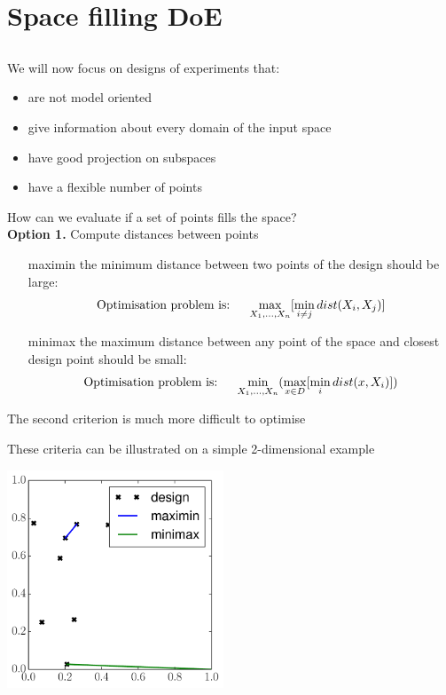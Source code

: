 \documentclass{beamer}
\begin{document}
\section{Space filling DoE}
\subsection{}


\begin{frame}{}
We will now focus on designs of experiments that:
\begin{itemize}
	\item are not model oriented
	\item give information about every domain of the input space
	\item have good projection on subspaces
	\item have a flexible number of points
\end{itemize}
\end{frame}

\begin{frame}{}
How can we evaluate if a set of points fills the space?\\ \vspace{5mm}
\textbf{Option 1.} Compute distances between points\\
\begin{itemize}
	\item[maximin] the minimum distance between two points of the design should be large:
	$$\text{Optimisation problem is: \quad} \max_{X_1,\dots,X_n} [ \min_{i \neq j} dist(X_i,X_j) ]$$
	\item[minimax] the maximum distance between any point of the space and closest design point should be small:
	$$\text{Optimisation problem is: \quad} \min_{X_1,\dots,X_n} (\max_{x \in D} [ \min_i dist(x,X_i) ])$$
\end{itemize}
The second criterion is much more difficult to optimise
\end{frame}

\begin{frame}{}
These criteria can be illustrated on a simple 2-dimensional example
\begin{center}
\includegraphics[height=6.5cm]{figures/python/spf_minimaxmaximin}
\end{center}
\end{frame}
\end{document}
